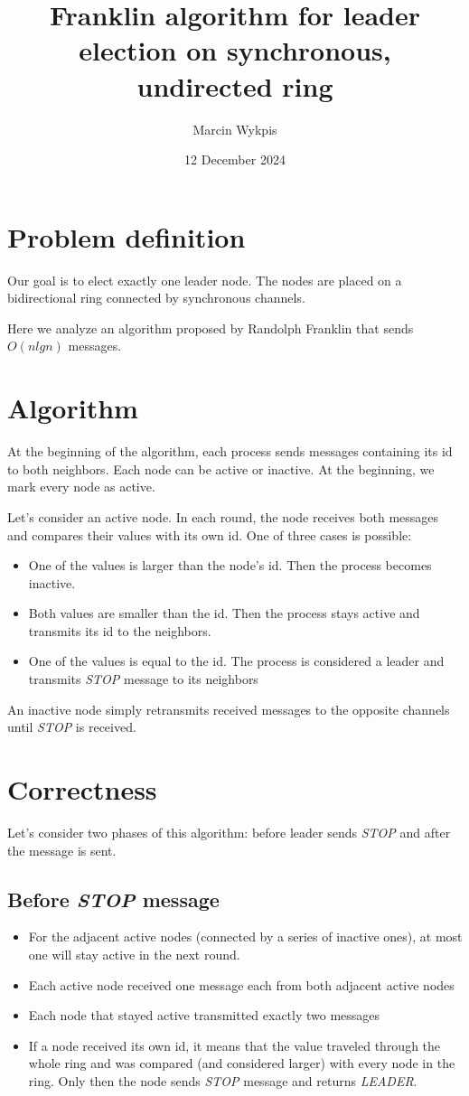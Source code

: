 \documentclass{article}
\title{Franklin algorithm for leader election on synchronous, undirected ring}
\author{Marcin Wykpis}
\date{12 December 2024}
\begin{document}
\maketitle
\section{Problem definition}
Our goal is to elect exactly one leader node. The nodes are placed on a bidirectional ring connected by synchronous channels. 

Here we analyze an algorithm proposed by Randolph Franklin \cite{franklin} that sends $O(n lgn)$ messages.

\section{Algorithm}
At the beginning of the algorithm, each process sends messages containing its id to both neighbors. Each node can be active or inactive. At the beginning, we mark every node as active.

Let's consider an active node. In each round, the node receives both messages and compares their values with its own id.
One of three cases is possible:
\begin{itemize}
    \item One of the values is larger than the node's id. Then the process becomes inactive.
    \item Both values are smaller than the id. Then the process stays active and transmits its id to the neighbors.
    \item One of the values is equal to the id. The process is considered a leader and transmits \textit{STOP} message to its neighbors
\end{itemize}
An inactive node simply retransmits received messages to the opposite channels until \textit{STOP} is received.

\newpage
\section{Correctness}
Let's consider two phases of this algorithm: before leader sends \textit{STOP} and after the message is sent.
\subsection{Before \textit{STOP} message}
\begin{itemize}
    \item For the adjacent active nodes (connected by a series of inactive ones), at most one will stay active in the next round.
    \item Each active node received one message each from both adjacent active nodes
    \item Each node that stayed active transmitted exactly two messages
    \item If a node received its own id, it means that the value traveled through the whole ring and was compared (and considered larger) with every node in the ring. Only then the node sends \textit{STOP} message and returns \textit{LEADER}.
\end{itemize}
\end{document}
